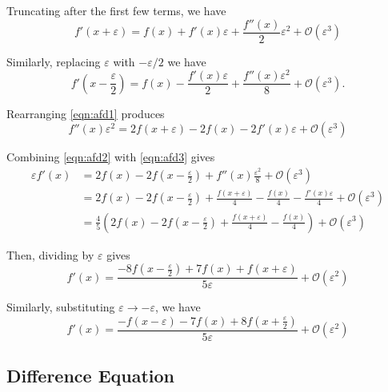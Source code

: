 Truncating after the first few terms, we have
\begin{equation}
  \label{eqn:afd1}
  f'(x+\varepsilon)  = f(x) + f'(x)\varepsilon + \frac{f''(x)}{2}\varepsilon^2 + \mathcal{O}(\varepsilon^3)
\end{equation}

Similarly, replacing $\varepsilon$ with $-\varepsilon/2$ we have
\begin{equation}
  \label{eqn:afd2}
  f'(x-\frac{\varepsilon}{2}) = f(x) - \frac{f'(x)\varepsilon}{2} + \frac{f''(x)\varepsilon^2}{8} + \mathcal{O}(\varepsilon^3).
\end{equation}

Rearranging \eqref{eqn:afd1} produces
\begin{equation}
  \label{eqn:afd3}
  f''(x)\varepsilon^2 = 2f(x+\varepsilon) - 2f(x) - 2f'(x)\varepsilon + \mathcal{O}(\varepsilon^3)
\end{equation}

Combining \eqref{eqn:afd2} with \eqref{eqn:afd3} gives
\begin{align*}
  \varepsilon f'(x) &= 2f(x) - 2f(x-\frac{\varepsilon}{2}) + f''(x)\frac{\varepsilon^2}{8} + \mathcal{O}(\varepsilon^3) \\
                    &= 2f(x) - 2f(x-\frac{\varepsilon}{2}) + \frac{f(x+\varepsilon)}{4} - \frac{f(x)}{4} - \frac{f'(x)\varepsilon}{4} + \mathcal{O}(\varepsilon^3) \\
                    &= \frac{4}{5}\left( 2f(x)-2f(x-\frac{\varepsilon}{2}) + \frac{f(x+\varepsilon)}{4} - \frac{f(x)}{4} \right) + \mathcal{O}(\varepsilon^3)
\end{align*}

Then, dividing by $\varepsilon$ gives
\begin{equation}
  f'(x) = \frac{-8f(x-\frac{\varepsilon}{2}) + 7f(x) + f(x+\varepsilon)}{5\varepsilon} + \mathcal{O}(\varepsilon^2)
\end{equation}

Similarly, substituting $\varepsilon \to -\varepsilon$, we have 
\begin{equation}
  f'(x) = \frac{- f(x-\varepsilon) - 7f(x) + 8f(x+\frac{\varepsilon}{2})}{5\varepsilon} + \mathcal{O}(\varepsilon^2)
\end{equation}


\subsection{Difference Equation}

